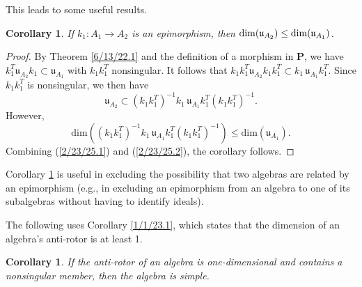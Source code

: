 \documentclass{amsart}
\numberwithin{equation}{section}
\newtheorem{corollary}[theorem]{Corollary}
\theoremstyle{definition}
\numberwithin{theorem}{section}
\begin{document}
This leads to some useful results.  

\begin{corollary} \label{8/17/22.5} If $k_1:A_1\rightarrow A_2$ is an epimorphism, then ${\rm dim}(\mathfrak{u}_{A_2}) \le {\rm dim}(\mathfrak{u}_{A_1})$. \end{corollary}  

\begin{proof} By Theorem \ref{6/13/22.1} and the definition of a morphism in $\mathbf{P}$, we have \mbox{$k_1^T \mathfrak{u}_{A_2} k_1 \subset \mathfrak{u}_{A_1}$} with $k_1k_1^T$ nonsingular.  It follows that  $k_1k_1^T \mathfrak{u}_{A_2} k_1k_1^T \subset k_1\,\mathfrak{u}_{A_1}k_1^T$.  Since $k_1k_1^T$ is nonsingular, we then have 
\begin{equation}\label{2/23/25.1} \mathfrak{u}_{A_2} \subset (k_1k_1^T)^{-1}k_1\, \mathfrak{u}_{A_1} k_1^T(k_1k_1^T)^{-1}.\end{equation}  However, \begin{equation}\label{2/23/25.2}  \text{dim}\left((k_1k_1^T)^{-1}k_1 \,\mathfrak{u}_{A_1} k_1^T(k_1k_1^T)^{-1}\right) \le \text{dim}(\mathfrak{u}_{A_1}).\end{equation} Combining (\ref{2/23/25.1}) and (\ref{2/23/25.2}), the corollary follows.
   \end{proof}
   
  Corollary \ref{8/17/22.5} is useful in excluding the possibility that two algebras are related by an epimorphism (e.g., in excluding an epimorphism from an algebra to one of its subalgebras without having to identify ideals).

The following uses Corollary \ref{1/1/23.1}, which states that the dimension of an algebra's anti-rotor is at least 1. 

\begin{corollary}\label{8/17/22.1} If the anti-rotor of an algebra is one-dimensional and contains a nonsingular member, then the algebra is simple. \end{corollary}
\end{document}
